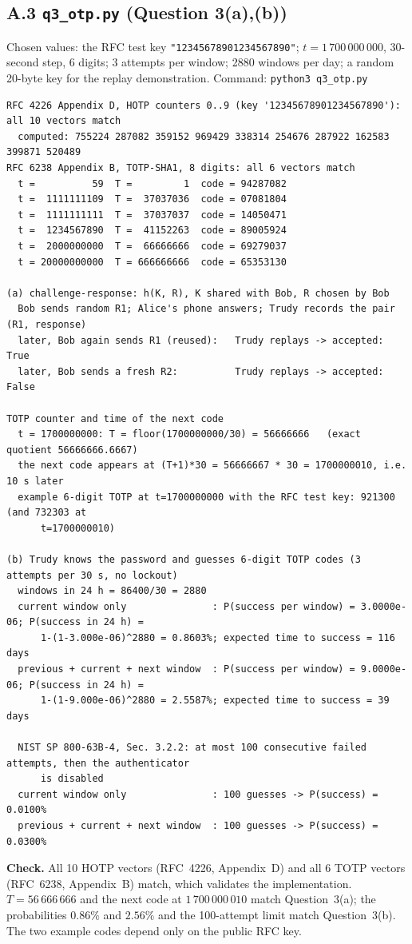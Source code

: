 \documentclass[11pt,a4paper]{article}
\begin{document}
\subsection*{A.3 \texttt{q3\_otp.py} (Question 3(a),(b))}
Chosen values: the RFC test key \texttt{"12345678901234567890"}; $t=1\,700\,000\,000$, 30-second step, 6 digits;
3 attempts per window; 2880 windows per day; a random 20-byte key for the replay demonstration.
Command: \texttt{python3 q3\_otp.py}
\begin{Verbatim}[fontsize=\footnotesize, frame=single]
RFC 4226 Appendix D, HOTP counters 0..9 (key '12345678901234567890'): all 10 vectors match
  computed: 755224 287082 359152 969429 338314 254676 287922 162583 399871 520489
RFC 6238 Appendix B, TOTP-SHA1, 8 digits: all 6 vectors match
  t =          59  T =         1  code = 94287082
  t =  1111111109  T =  37037036  code = 07081804
  t =  1111111111  T =  37037037  code = 14050471
  t =  1234567890  T =  41152263  code = 89005924
  t =  2000000000  T =  66666666  code = 69279037
  t = 20000000000  T = 666666666  code = 65353130

(a) challenge-response: h(K, R), K shared with Bob, R chosen by Bob
  Bob sends random R1; Alice's phone answers; Trudy records the pair (R1, response)
  later, Bob again sends R1 (reused):   Trudy replays -> accepted: True
  later, Bob sends a fresh R2:          Trudy replays -> accepted: False

TOTP counter and time of the next code
  t = 1700000000: T = floor(1700000000/30) = 56666666   (exact quotient 56666666.6667)
  the next code appears at (T+1)*30 = 56666667 * 30 = 1700000010, i.e. 10 s later
  example 6-digit TOTP at t=1700000000 with the RFC test key: 921300  (and 732303 at
      t=1700000010)

(b) Trudy knows the password and guesses 6-digit TOTP codes (3 attempts per 30 s, no lockout)
  windows in 24 h = 86400/30 = 2880
  current window only               : P(success per window) = 3.0000e-06; P(success in 24 h) =
      1-(1-3.000e-06)^2880 = 0.8603%; expected time to success = 116 days
  previous + current + next window  : P(success per window) = 9.0000e-06; P(success in 24 h) =
      1-(1-9.000e-06)^2880 = 2.5587%; expected time to success = 39 days

  NIST SP 800-63B-4, Sec. 3.2.2: at most 100 consecutive failed attempts, then the authenticator
      is disabled
  current window only               : 100 guesses -> P(success) = 0.0100%
  previous + current + next window  : 100 guesses -> P(success) = 0.0300%
\end{Verbatim}
\textbf{Check.} All 10 HOTP vectors (RFC~4226, Appendix~D) and all 6 TOTP vectors (RFC~6238, Appendix~B) match, which
validates the implementation. $T=56\,666\,666$ and the next code at $1\,700\,000\,010$ match Question~3(a); the
probabilities $0.86\%$ and $2.56\%$ and the 100-attempt limit match Question~3(b). The two example codes depend
only on the public RFC key.
\end{document}
